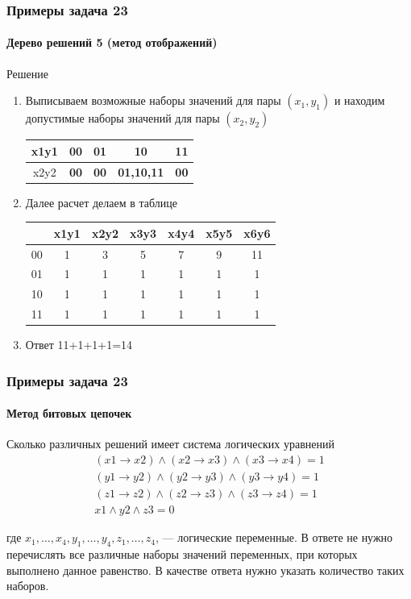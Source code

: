 \begin{frame}[t]
\frametitle{Примеры задача 23}
\framesubtitle{Дерево решений 5 (метод отображений)}

\begin{block}{Решение}
\begin{enumerate}
	\item Выписываем возможные наборы значений для пары $(x_1,y_1)$ и находим допустимые наборы значений для пары $(x_2,y_2)$ \\ 	\pause 
\begin{tabular}{|c|c|c|c|c|}
\hline 
x1y1 & 00 & 01 & 10 & 11\tabularnewline
\hline 
\hline 
x2y2 & \textbf{00} & \textbf{00} & \textbf{01,10,11} & \textbf{00}\tabularnewline
\hline 
\end{tabular} 	\pause 
\item Далее расчет делаем в таблице\\
\begin{tabular}{|c|c|c|c|c|c|c|}
\hline 
 & x1y1 & x2y2 & x3y3 & x4y4 & x5y5 & x6y6 \tabularnewline
\hline 
00 & 1 & 3 & 5 & 7 & 9 &  11\tabularnewline
\hline 
01 & 1 & 1 & 1 & 1 & 1  & 1 \tabularnewline
\hline
10 & 1 & 1 & 1 & 1 & 1 &  1\tabularnewline
\hline 
11 & 1 & 1 & 1 & 1 & 1 & 1 \tabularnewline
\hline 
\end{tabular}
\item Ответ 11+1+1+1=14
\end{enumerate}
\end{block}

	
\end{frame}




\begin{frame}[t]
\frametitle{Примеры задача 23}
\framesubtitle{Метод битовых цепочек}
Сколько различных решений имеет система логических уравнений 
\begin{align*}
(x1 \rightarrow x2) \wedge (x2 \rightarrow x3) \wedge (x3 \rightarrow x4) = 1\\
(y1 \rightarrow y2) \wedge (y2 \rightarrow y3) \wedge (y3 \rightarrow y4) = 1\\
(z1 \rightarrow z2) \wedge (z2 \rightarrow z3) \wedge (z3 \rightarrow z4) = 1\\
x1 \wedge y2 \wedge z3  = 0
\end{align*}


где $x_1, \ldots, x_4, y_1, \ldots, y_4, z_1, \ldots, z_4$, --- логические переменные. В ответе не нужно перечислять все различные наборы значений переменных, при которых выполнено данное равенство. В качестве ответа нужно указать количество таких наборов.

	
\end{frame}


